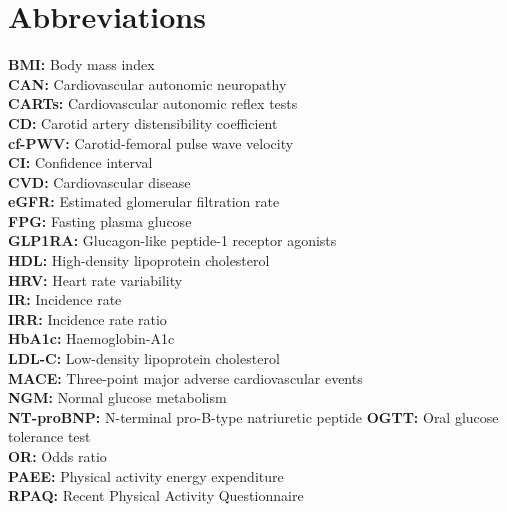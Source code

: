 \documentclass[
  letterpaper,
  headsepline=true,
  open=any]{scrbook}
\begin{document}
\newpage

{\let\clearpage\relax \tableofcontents} 

\listoffigures

\listoftables


\hypertarget{abbreviations}{%
\chapter*{Abbreviations}\label{abbreviations}}


\textbf{BMI:} Body mass index\\
\textbf{CAN:} Cardiovascular autonomic neuropathy\\
\textbf{CARTs:} Cardiovascular autonomic reflex tests\\
\textbf{CD:} Carotid artery distensibility coefficient\\
\textbf{cf-PWV:} Carotid-femoral pulse wave velocity\\
\textbf{CI:} Confidence interval\\
\textbf{CVD:} Cardiovascular disease\\
\textbf{eGFR:} Estimated glomerular filtration rate\\
\textbf{FPG:} Fasting plasma glucose\\
\textbf{GLP1RA:} Glucagon-like peptide-1 receptor agonists\\
\textbf{HDL:} High-density lipoprotein cholesterol\\
\textbf{HRV:} Heart rate variability\\
\textbf{IR:} Incidence rate\\
\textbf{IRR:} Incidence rate ratio\\
\textbf{HbA1c:} Haemoglobin-A1c\\
\textbf{LDL-C:} Low-density lipoprotein cholesterol\\
\textbf{MACE:} Three-point major adverse cardiovascular events\\
\textbf{NGM:} Normal glucose metabolism\\
\textbf{NT-proBNP:} N-terminal pro-B-type natriuretic peptide
\textbf{OGTT:} Oral glucose tolerance test\\
\textbf{OR:} Odds ratio\\
\textbf{PAEE:} Physical activity energy expenditure\\
\textbf{RPAQ:} Recent Physical Activity Questionnaire\\
\end{document}
